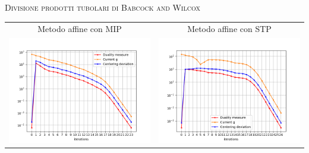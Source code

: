 \begin{frame}{\textsc{\LARGE \textcolor{iris}{Divisione prodotti tubolari di Babcock and Wilcox}}}
	\centering
	\begin{tabular}{c@{}c}
		\small{Metodo affine con MIP} & \small{Metodo affine con STP} \\
		\includegraphics[scale = 0.33]{tub_aff1}
		&\includegraphics[scale = 0.33]{tub_aff3}\\ 
	\end{tabular}
\end{frame}

